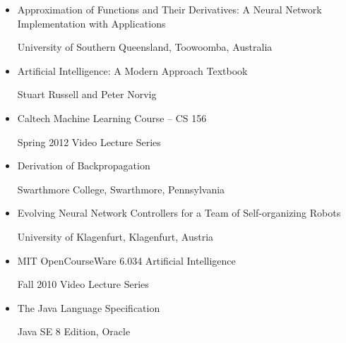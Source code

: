 \documentclass[letterpaper, 10pt]{article}
\begin{document}
	\begin{itemize}		
		\item Approximation of Functions and Their Derivatives: A Neural Network Implementation with Applications
		
			\hspace{1.5cm} University of Southern Queensland, Toowoomba, Australia
		\item Artificial Intelligence: A Modern Approach Textbook
			
			\hspace{1.5cm} Stuart Russell and Peter Norvig
		\item Caltech Machine Learning Course -- CS 156
		
			\hspace{1.5cm} Spring 2012 Video Lecture Series
		\item Derivation of Backpropagation
		
			\hspace{1.5cm} Swarthmore College, Swarthmore, Pennsylvania
		\item Evolving Neural Network Controllers for a Team of Self-organizing Robots
		
			\hspace{1.5cm} University of Klagenfurt, Klagenfurt, Austria	
		\item MIT OpenCourseWare 6.034 Artificial Intelligence
		
			\hspace{1.5cm} Fall 2010 Video Lecture Series				
		\item The Java Language Specification
			
			\hspace{1.5cm} Java SE 8 Edition, Oracle
	\end{itemize}
\end{document}
